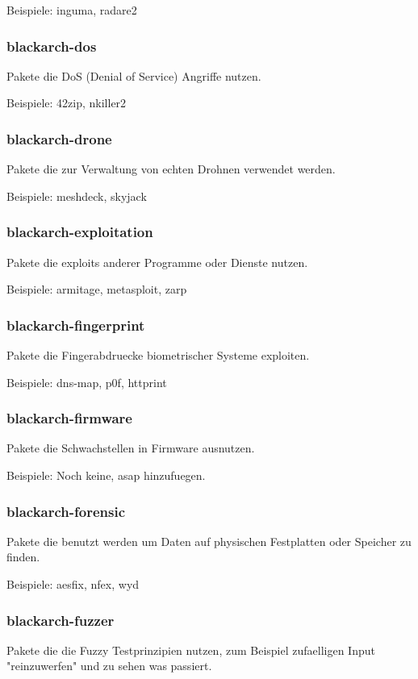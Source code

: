\documentclass[a4paper, oneside, 11pt]{book}
\begin{document}
Beispiele: inguma, radare2

\subsubsection{blackarch-dos}
Pakete die DoS (Denial of Service) Angriffe nutzen.

Beispiele: 42zip, nkiller2

\subsubsection{blackarch-drone}
Pakete die zur Verwaltung von echten Drohnen verwendet werden.

Beispiele: meshdeck, skyjack

\subsubsection{blackarch-exploitation}
Pakete die exploits anderer Programme oder Dienste nutzen.

Beispiele: armitage, metasploit, zarp

\subsubsection{blackarch-fingerprint}
Pakete die Fingerabdruecke biometrischer Systeme exploiten.

Beispiele: dns-map, p0f, httprint

\subsubsection{blackarch-firmware}
Pakete die Schwachstellen in Firmware ausnutzen.

Beispiele: Noch keine, asap hinzufuegen.

\subsubsection{blackarch-forensic}
Pakete die benutzt werden um Daten auf physischen Festplatten oder Speicher zu finden.

Beispiele: aesfix, nfex, wyd

\subsubsection{blackarch-fuzzer}
Pakete die die Fuzzy Testprinzipien nutzen, zum Beispiel
zufaelligen Input "reinzuwerfen" und zu sehen was passiert.
\end{document}
